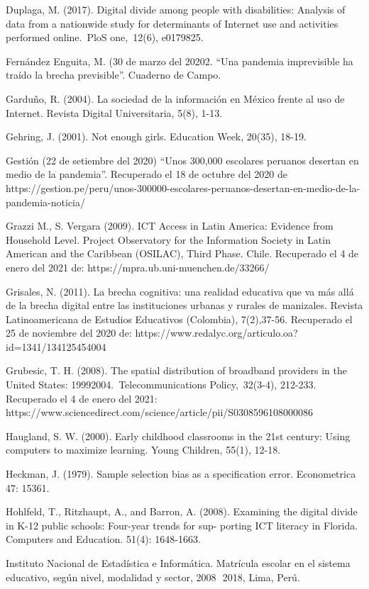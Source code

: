 Duplaga, M. (2017). Digital divide among people with disabilities:
Analysis of data from a nationwide study for determinants of Internet
use and activities performed online.~PloS one,~12(6), e0179825.

Fernández Enguita, M. (30 de marzo del 20202. ``Una pandemia
imprevisible ha traído la brecha previsible''. Cuaderno de Campo.

Garduño, R. (2004). La sociedad de la información en México frente al
uso de Internet. Revista Digital Universitaria, 5(8), 1-13.

Gehring, J. (2001). Not enough girls. Education Week, 20(35), 18-19.

Gestión (22 de setiembre del 2020) ``Unos 300,000 escolares peruanos
desertan en medio de la pandemia''. Recuperado el 18 de octubre del 2020
de
https://gestion.pe/peru/unos-300000-escolares-peruanos-desertan-en-medio-de-la-pandemia-noticia/

Grazzi M., S. Vergara (2009). ICT Access in Latin America: Evidence from
Household Level. Project Observatory for the Information Society in
Latin American and the Caribbean (OSILAC), Third Phase. Chile.
Recuperado el 4 de enero del 2021 de:
https://mpra.ub.uni-muenchen.de/33266/

Grisales, N. (2011). La brecha cognitiva: una realidad educativa que va
más allá de la brecha digital entre las instituciones urbanas y rurales
de manizales. Revista Latinoamericana de Estudios Educativos (Colombia),
7(2),37-56. Recuperado el 25 de noviembre del 2020 de:
https://www.redalyc.org/articulo.oa?id=1341/134125454004

Grubesic, T. H. (2008). The spatial distribution of broadband providers
in the United States: 19992004.~Telecommunications Policy,~32(3-4),
212-233. Recuperado el 4 de enero del 2021:
https://www.sciencedirect.com/science/article/pii/S0308596108000086

Haugland, S. W. (2000). Early childhood classrooms in the 21st century:
Using computers to maximize learning. Young Children, 55(1), 12-18.

Heckman, J. (1979). Sample selection bias as a specification error.
Econometrica 47: 15361.

Hohlfeld, T., Ritzhaupt, A., and Barron, A. (2008). Examining the
digital divide in K-12 public schools: Four-year trends for sup- porting
ICT literacy in Florida. Computers and Education. 51(4): 1648-1663.

Instituto Nacional de Estadística e Informática. Matrícula escolar en el
sistema educativo, según nivel, modalidad y sector, 2008  2018, Lima,
Perú.

